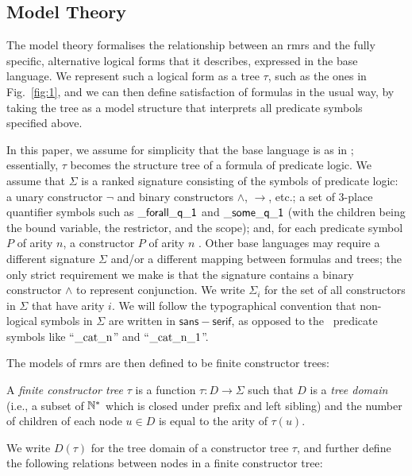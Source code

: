 \subsection{Model Theory} \label{sec:model-theory}

The model theory formalises the relationship between an {\sc rmrs} and
the fully specific, alternative logical forms that it describes,
expressed in the base language.  We represent such a logical form as a
tree $\tau$, such as the ones in Fig.~\ref{fig:1}, and we can then
define satisfaction of formulas in the usual way, by taking the tree
as a model structure that interprets all predicate symbols specified
above.

In this paper, we assume for simplicity that the base language is as
in \mrs; essentially, $\tau$ becomes the structure tree of a formula
of predicate logic.  We assume that $\Sigma$ is a ranked signature
consisting of the symbols of predicate logic: a unary constructor
$\neg$ and binary constructors $\wedge$, $\rightarrow$, etc.; a set of
3-place quantifier symbols such as $\mathsf{\_forall\_q\_1}$ and
$\mathsf{\_some\_q\_1}$ (with the children being the bound variable, the
restrictor, and the scope); and, for each predicate symbol $P$ of
arity $n$, a constructor $P$ of arity $n$ .  Other
base languages may require a different signature $\Sigma$ and/or a
different mapping between formulas and trees; the only strict
requirement we make is that the signature contains a binary
constructor $\wedge$ to represent conjunction.  We write $\Sigma_i$
for the set of all constructors in $\Sigma$ that have arity $i$.  We
will follow the typographical convention that non-logical symbols in
$\Sigma$ are written in $\mathsf{sans{-}serif}$, as opposed to the
\rmrs\ predicate symbols like ``$\mathrm{\_cat\_n}$'' and
``$\mathrm{\_cat\_n\_1}$''.

The models of {\sc rmrs} are then defined to be finite constructor
trees:
\begin{definition}\label{defn:models}
  A {\em finite constructor tree} $\tau$ is a function $\tau:D
  \rightarrow \Sigma$ such that $D$ is a \emph{tree domain} (i.e., a
  subset of $\mathbb{N}^*$ which is closed under prefix and left sibling) and
  the number of children of each node $u \in D$ is equal to the arity
  of $\tau(u)$.  
\end{definition}

We write $D(\tau)$ for the tree domain of a constructor tree $\tau$,
and further define the following relations between nodes in a finite
constructor tree:


